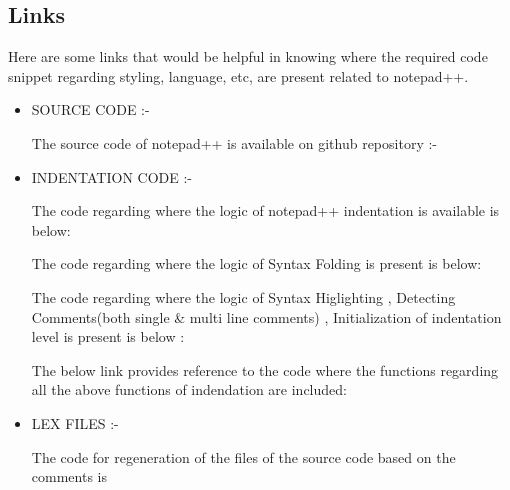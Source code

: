 \subsection{Links}
Here are some links that would be helpful in knowing where the required code snippet
regarding styling, language, etc, are present related to notepad++. \newline
\begin{itemize}
\item SOURCE CODE :-  
\begin{center}
The source code of notepad++ is available on github repository :- 
\end{center}
\item INDENTATION CODE :-  
\begin{center}
The code regarding where the logic of notepad++ indentation is available is below:  
\end{center}
\begin{center}
The code regarding where the logic of Syntax Folding is present is below:  
\end{center}
\begin{center}
The code regarding where the logic of Syntax Higlighting , Detecting
Comments(both single \& multi line comments) , Initialization of indentation level is
present is below :  
\end{center}
\begin{center}
The below link provides reference to the code where the functions regarding all the
above functions of indendation are included:  
\end{center}
\item LEX FILES :-  \newline
\begin{center}
The code for regeneration of the files of the source code based on the comments is

\end{center}
\end{itemize}
